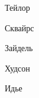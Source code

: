 \documentclass[a5paper,10pt,oneside]{report}
\begin{document}








%

%

\begin{thebibliography}{1}

Тейлор

Сквайрс

Зайдель

Худсон

Идье

\end{thebibliography}
\end{document}
